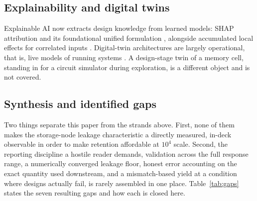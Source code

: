 \documentclass[11pt,a4paper]{article}
\begin{document}
\subsection{Explainability and digital twins}

Explainable AI now extracts design knowledge from learned models: SHAP
attribution \cite{homafar2022shap,abdollahi2024xai,liu2025xaimat} and its
foundational unified formulation \cite{lundberg2017shap,lundberg2020treeshap},
alongside accumulated local effects for correlated inputs \cite{apley2020ale}.
Digital-twin architectures are largely operational, that is, live models of
running systems \cite{ruhe2023dtwin,massaro2025dtwin}. A design-stage twin of a
memory cell, standing in for a circuit simulator during exploration, is a
different object and is not covered.

\subsection{Synthesis and identified gaps}

Two things separate this paper from the strands above. First, none of them makes
the storage-node leakage characteristic a directly measured, in-deck observable
in order to make retention affordable at $10^{4}$ scale. Second, the reporting
discipline a hostile reader demands, validation across the full response range, a
numerically converged leakage floor, honest error accounting on the exact
quantity used downstream, and a mismatch-based yield at a condition where designs
actually fail, is rarely assembled in one place. Table~\ref{tab:gaps} states the
seven resulting gaps and how each is closed here.
\end{document}
